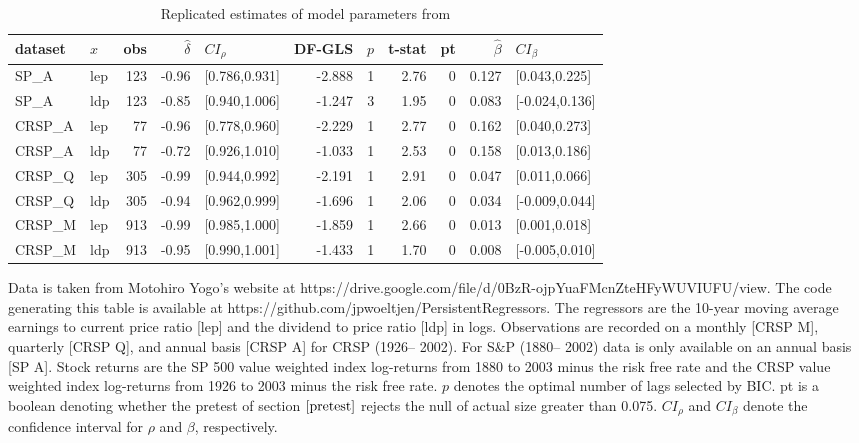 \documentclass{article}
\begin{document}
\begin{table}[h!]
\small
\setlength\tabcolsep{5.3pt}
\centering
\caption{Replicated estimates of model parameters from \citet{campbell2006efficient}}
\label{tab:cy_sp}
\begin{threeparttable}
\begin{tabular}{llrrlrrrrrl}
  \hline
dataset & $x$ & obs & $\hat{\delta}$ & $CI_{\rho}$ & DF-GLS & $p$ &t-stat & pt & $\hat{\beta}$ & $CI_{\beta}$ \\ 
  \hline
  SP\_A & lep & 123 & -0.96 & [0.786,0.931] & -2.888 & 1 & 2.76 & 0 & 0.127 & [0.043,0.225] \\ 
  SP\_A & ldp & 123 & -0.85 & [0.940,1.006] & -1.247 & 3 & 1.95 & 0 & 0.083 & [-0.024,0.136] \\ 
  CRSP\_A & lep & 77 & -0.96 & [0.778,0.960] & -2.229 & 1 & 2.77 & 0 & 0.162 & [0.040,0.273] \\ 
  CRSP\_A & ldp & 77 & -0.72 & [0.926,1.010] & -1.033 & 1 & 2.53 & 0 & 0.158 & [0.013,0.186] \\ 
  CRSP\_Q & lep & 305 & -0.99 & [0.944,0.992] & -2.191 & 1 & 2.91 & 0 & 0.047 & [0.011,0.066] \\ 
  CRSP\_Q & ldp & 305 & -0.94 & [0.962,0.999] & -1.696 & 1 & 2.06 & 0 & 0.034 & [-0.009,0.044] \\ 
  CRSP\_M & lep & 913 & -0.99 & [0.985,1.000] & -1.859 & 1 & 2.66 & 0 & 0.013 & [0.001,0.018] \\ 
  CRSP\_M & ldp & 913 & -0.95 & [0.990,1.001] & -1.433 & 1 & 1.70 & 0 & 0.008 & [-0.005,0.010] \\ 
\hline
\end{tabular}
 \begin{tablenotes}
 \small
\item Data is taken from Motohiro Yogo's website at https://drive.google.com/file/d/0BzR-ojpYuaFMcnZteHFyWUVIUFU/view. The code generating this table is available at https://github.com/jpwoeltjen/PersistentRegressors. The regressors are the 10-year moving average earnings to current price ratio [lep] and the dividend to price ratio [ldp] in logs. Observations are recorded on a monthly [CRSP M], quarterly [CRSP Q], and annual basis [CRSP A] for CRSP (1926– 2002). For S\&P (1880– 2002) data is only available on an annual basis [SP A]. Stock returns are the SP 500 value weighted index log-returns from 1880 to 2003 minus the risk free rate and the CRSP value weighted index log-returns from 1926 to 2003 minus the risk free rate. $p$ denotes the optimal number of lags selected by BIC. pt is a boolean denoting whether the pretest of section $\ref{pretest}$ rejects the null of actual size greater than 0.075. $CI_{\rho}$ and $CI_{\beta}$ denote the confidence interval for $\rho$ and $\beta$, respectively.
\end{tablenotes}
\end{threeparttable}
\end{table}
\end{document}
